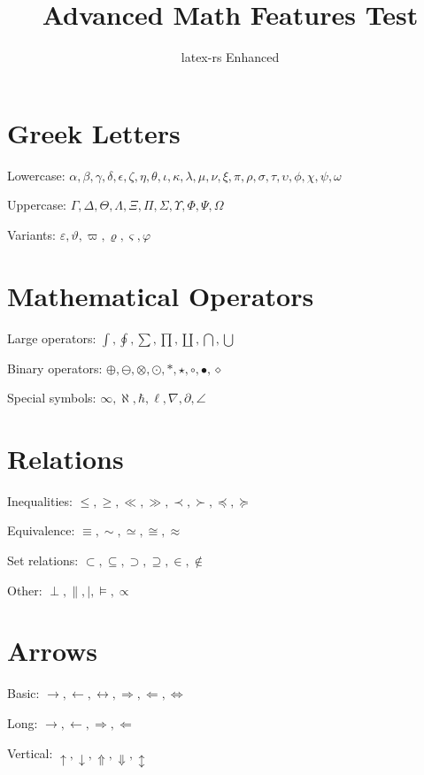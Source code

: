 \documentclass{article}
\title{Advanced Math Features Test}
\author{latex-rs Enhanced}
\begin{document}
\maketitle

\section{Greek Letters}

Lowercase: $\alpha, \beta, \gamma, \delta, \epsilon, \zeta, \eta, \theta, \iota, \kappa, \lambda, \mu, \nu, \xi, \pi, \rho, \sigma, \tau, \upsilon, \phi, \chi, \psi, \omega$

Uppercase: $\Gamma, \Delta, \Theta, \Lambda, \Xi, \Pi, \Sigma, \Upsilon, \Phi, \Psi, \Omega$

Variants: $\varepsilon, \vartheta, \varpi, \varrho, \varsigma, \varphi$

\section{Mathematical Operators}

Large operators: $\int, \oint, \sum, \prod, \coprod, \bigcap, \bigcup$

Binary operators: $\oplus, \ominus, \otimes, \odot, \ast, \star, \circ, \bullet, \diamond$

Special symbols: $\infty, \aleph, \hbar, \ell, \nabla, \partial, \angle$

\section{Relations}

Inequalities: $\leq, \geq, \ll, \gg, \prec, \succ, \preceq, \succeq$

Equivalence: $\equiv, \sim, \simeq, \cong, \approx$

Set relations: $\subset, \subseteq, \supset, \supseteq, \in, \notin$

Other: $\perp, \parallel, \mid, \models, \propto$

\section{Arrows}

Basic: $\rightarrow, \leftarrow, \leftrightarrow, \Rightarrow, \Leftarrow, \Leftrightarrow$

Long: $\longrightarrow, \longleftarrow, \Longrightarrow, \Longleftarrow$

Vertical: $\uparrow, \downarrow, \Uparrow, \Downarrow, \updownarrow$
\end{document}
